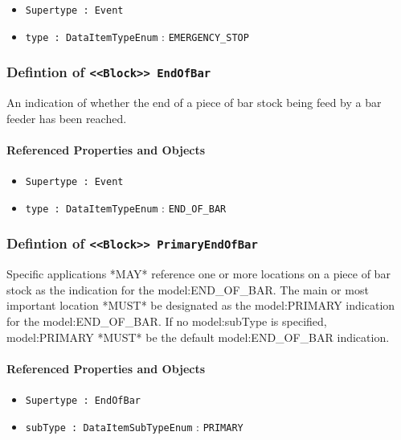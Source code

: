 \begin{itemize}
\item \texttt{Supertype : Event}

\item \texttt{type : DataItemTypeEnum} : \texttt{EMERGENCY_STOP}

\end{itemize}
\FloatBarrier
\subsubsection{Defintion of \texttt{<<Block>> EndOfBar}}
  \label{type:EndOfBar}

\FloatBarrier

An indication of whether the end of a piece of bar stock being feed by a bar feeder has been reached.

\FloatBarrier
\paragraph{Referenced Properties and Objects}

\begin{itemize}
\item \texttt{Supertype : Event}

\item \texttt{type : DataItemTypeEnum} : \texttt{END_OF_BAR}

\end{itemize}
\FloatBarrier
\subsubsection{Defintion of \texttt{<<Block>> PrimaryEndOfBar}}
  \label{type:PrimaryEndOfBar}

\FloatBarrier

Specific applications *MAY* reference one or more locations on a piece of bar stock as the indication for the {model:END_OF_BAR}. The main or most important location *MUST* be designated as the {model:PRIMARY} indication for the {model:END_OF_BAR}.   
 If no {model:subType} is specified, {model:PRIMARY} *MUST* be the default {model:END_OF_BAR} indication.

\FloatBarrier
\paragraph{Referenced Properties and Objects}

\begin{itemize}
\item \texttt{Supertype : EndOfBar}

\item \texttt{subType : DataItemSubTypeEnum} : \texttt{PRIMARY}

\end{itemize}
\FloatBarrier
